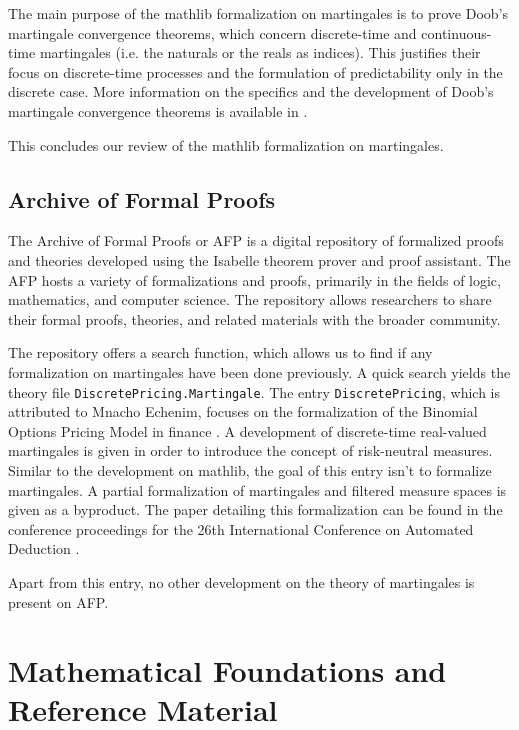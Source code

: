 The main purpose of the \textsf{mathlib} formalization on martingales is to prove Doob's martingale convergence theorems, which concern discrete-time and continuous-time martingales (i.e. the naturals or the reals as indices). This justifies their focus on discrete-time processes and the formulation of predictability only in the discrete case. More information on the specifics and the development of Doob's martingale convergence theorems is available in \cite{ying2022formalization}.

This concludes our review of the \textsf{mathlib} formalization on martingales.

\subsection{Archive of Formal Proofs}

The \textsf{Archive of Formal Proofs} or \textsf{AFP} is a digital repository of formalized proofs and theories developed using the Isabelle theorem prover and proof assistant. The \textsf{AFP}  hosts a variety of formalizations and proofs, primarily in the fields of logic, mathematics, and computer science. The repository allows researchers to share their formal proofs, theories, and related materials with the broader community.

The repository offers a search function, which allows us to find if any formalization on martingales have been done previously. A quick search yields the theory file \texttt{DiscretePricing.Martingale}. The entry \texttt{DiscretePricing}, which is attributed to Mnacho Echenim, focuses on the formalization of the Binomial Options Pricing Model in finance \cite{DiscretePricing-AFP}. A development of discrete-time real-valued martingales is given in order to introduce the concept of risk-neutral measures. Similar to the development on \textsf{mathlib}, the goal of this entry isn't to formalize martingales. A partial formalization of martingales and filtered measure spaces is given as a byproduct. The paper detailing this formalization can be found in the conference proceedings for the 26th International Conference on Automated Deduction \cite{EchenimPeltier}.

Apart from this entry, no other development on the theory of martingales is present on \textsf{AFP}.

\section{Mathematical Foundations and Reference Material}

